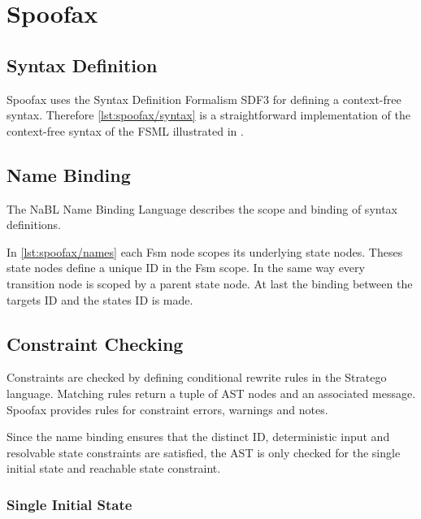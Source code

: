 \section{Spoofax}
\label{s:spoofax}

\subsection{Syntax Definition}

Spoofax uses the Syntax Definition Formalism SDF3 for defining a context-free syntax.
Therefore \autoref{lst:spoofax/syntax} is a straightforward implementation of the context-free syntax of the FSML illustrated in  \cite{laemmel2014}.



\subsection{Name Binding}

The NaBL Name Binding Language describes the scope and binding of syntax definitions.

In \autoref{lst:spoofax/names} each Fsm node scopes its underlying state nodes.
Theses state nodes define a unique ID in the Fsm scope.
In the same way every transition node is scoped by a parent state node.
At last the binding between the targets ID and the states ID is made.



\subsection{Constraint Checking}

Constraints are checked by defining conditional rewrite rules in the Stratego language.
Matching rules return a tuple of AST nodes and an associated message.
Spoofax provides rules for constraint errors, warnings and notes.

Since the name binding ensures that the distinct ID, deterministic input and resolvable state constraints  are satisfied, the AST is only checked for the single initial state and reachable state constraint.

\subsubsection{Single Initial State}

